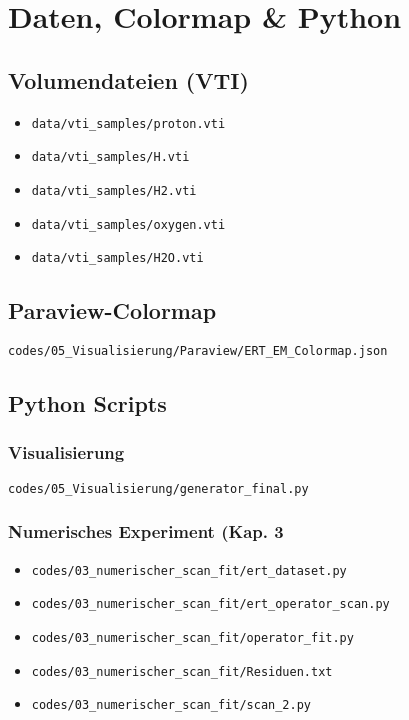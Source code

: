 \chapter{Daten, Colormap \& Python}
\section{Volumendateien (VTI)}
\begin{itemize}
  \item \texttt{data/vti\_samples/proton.vti}
  \item \texttt{data/vti\_samples/H.vti}
  \item \texttt{data/vti\_samples/H2.vti}
  \item \texttt{data/vti\_samples/oxygen.vti}
  \item \texttt{data/vti\_samples/H2O.vti}
\end{itemize}

\section{Paraview-Colormap}
\texttt{codes/05\_Visualisierung/Paraview/ERT\_EM\_Colormap.json}

\section{Python Scripts}

\subsection{Visualisierung}

\texttt{codes/05\_Visualisierung/generator\_final.py}

\subsection{Numerisches Experiment (Kap. 3}
\begin{itemize}
  \item \texttt{codes/03\_numerischer\_scan\_fit/ert\_dataset.py}
  \item \texttt{codes/03\_numerischer\_scan\_fit/ert\_operator\_scan.py}
  \item \texttt{codes/03\_numerischer\_scan\_fit/operator\_fit.py}
  \item \texttt{codes/03\_numerischer\_scan\_fit/Residuen.txt}
  \item \texttt{codes/03\_numerischer\_scan\_fit/scan\_2.py}
\end{itemize}